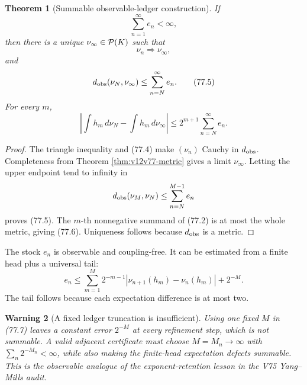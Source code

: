 \documentclass[11pt]{article}
\newtheorem{theorem}{Theorem}[section]
\newtheorem{warning}[theorem]{Warning}
\theoremstyle{remark}
\begin{document}
\begin{theorem}[Summable observable-ledger construction]
\label{thm:v12v77-summable}
If
\begin{equation}
                              \sum_{n=1}^{\infty}e_n<\infty,  \tag{77.4}
\end{equation}
then there is a unique \(\nu_\infty\in{\cal P}(K)\) such that
\[
                         \nu_n\Rightarrow\nu_\infty,
\]
and
\begin{equation}
 d_{\rm obs}(\nu_N,\nu_\infty)
 \leq\sum_{n=N}^{\infty}e_n.                                \tag{77.5}
\end{equation}
For every \(m\),
\begin{equation}
 \left|\int h_m\,d\nu_N-\int h_m\,d\nu_\infty\right|
 \leq 2^{m+1}\sum_{n=N}^{\infty}e_n.                        \tag{77.6}
\end{equation}
\end{theorem}

\begin{proof}
The triangle inequality and (77.4) make \((\nu_n)\) Cauchy in
\(d_{\rm obs}\).  Completeness from Theorem
\ref{thm:v12v77-metric} gives a limit \(\nu_\infty\).
Letting the upper endpoint tend to infinity in
\[
 d_{\rm obs}(\nu_M,\nu_N)\leq
 \sum_{n=N}^{M-1}e_n
\]
proves (77.5).  The \(m\)-th nonnegative summand of (77.2) is at most
the whole metric, giving (77.6).  Uniqueness follows because
\(d_{\rm obs}\) is a metric.
\end{proof}

The stock \(e_n\) is observable and coupling-free.  It can be
estimated from a finite head plus a universal tail:
\begin{equation}
 e_n\leq
 \sum_{m=1}^{M}2^{-m-1}
 \left|\nu_{n+1}(h_m)-\nu_n(h_m)\right|
 +2^{-M}.                                                   \tag{77.7}
\end{equation}
The tail follows because each expectation difference is at most two.

\begin{warning}[A fixed ledger truncation is insufficient]
\label{warn:v12v77-truncation}
Using one fixed \(M\) in (77.7) leaves a constant error \(2^{-M}\)
at every refinement step, which is not summable.  A valid adjacent
certificate must choose \(M=M_n\to\infty\) with
\(\sum_n2^{-M_n}<\infty\), while also making the finite-head
expectation defects summable.  This is the observable analogue of
the exponent-retention lesson in the V75 Yang--Mills audit.
\end{warning}
\end{document}
